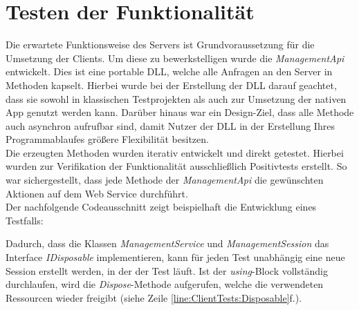 \section{Testen der Funktionalität}
\label{sec:server-tests}
Die erwartete Funktionsweise des Servers ist Grundvoraussetzung für die Umsetzung der Clients. Um diese zu bewerkstelligen wurde die \textit{ManagementApi} entwickelt. Dies ist eine portable \ac{DLL}, welche alle Anfragen an den Server in Methoden kapselt. Hierbei wurde bei der Erstellung der \ac{DLL} darauf geachtet, dass sie sowohl in klassischen Testprojekten als auch zur Umsetzung der nativen App genutzt werden kann. Darüber hinaus war ein Design-Ziel, dass alle Methode auch asynchron aufrufbar sind, damit Nutzer der \ac{DLL} in der Erstellung Ihres Programmablaufes größere Flexibilität besitzen. \\
Die erzeugten Methoden wurden iterativ entwickelt und direkt getestet. Hierbei wurden zur Verifikation der Funktionalität ausschließlich Positivtests erstellt. So war sichergestellt, dass jede Methode der \textit{ManagementApi} die gewünschten Aktionen auf dem Web Service durchführt. \\
Der nachfolgende Codeausschnitt zeigt beispielhaft die Entwicklung eines Testfalls:

Dadurch, dass die Klassen \textit{ManagementService} und \textit{ManagementSession} das Interface \textit{IDisposable} implementieren, kann für jeden Test unabhängig eine neue Session erstellt werden, in der der Test läuft. Ist der \textit{using}-Block vollständig durchlaufen, wird die \textit{Dispose}-Methode aufgerufen, welche die verwendeten Ressourcen wieder freigibt (siehe Zeile \ref{line:ClientTests:Disposable}f.). 
